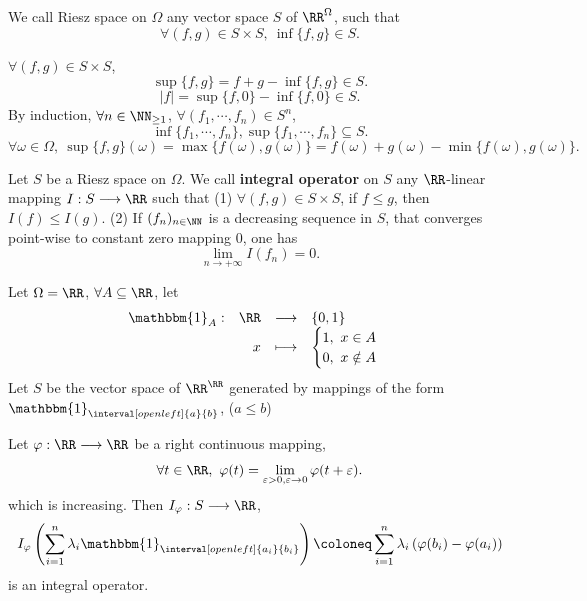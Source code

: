 \begin{definitionenv}
    We call Riesz space on $\Omega$ any vector space $S$ of $\RR^\Omega$, such that 
    $$ \forall (f,g)\in S\times S,\ \inf\{f,g\}\in S.$$
\end{definitionenv}
\begin{remark}
    $\forall (f,g)\in S\times S$, 
    $$ \sup \{f,g\}=f+g-\inf\{f,g\}\in S.$$
    $$ |f|=\sup \{f,0\} -\inf\{f,0\} \in S.$$
    By induction, $\forall n\in \NN_{\ge 1}$, $\forall (f_1,\cdots,f_n)\in S^n$, 
    $$ \inf\{f_1,\cdots,f_n\}, \sup\{f_1,\cdots,f_n\}\subseteq S.$$
    $$ \forall \omega \in \Omega,\ \sup\{f,g\}(\omega)=\max\{f(\omega),g(\omega)\}=f(\omega)+g(\omega)-\min\{f(\omega),g(\omega)\}.$$
\end{remark}
\begin{definitionenv}
    Let $S$ be a Riesz space on $\Omega$. We call \textbf{integral operator} on $S$ any $\RR$-linear mapping $I:S\longrightarrow \RR$ such that
    \newline
    (1) $\forall (f,g)\in S\times S$, if $f\le g$, then $I(f)\le I(g)$.
    \newline
    (2) If $(f_n)_{n\in\NN}$ is a decreasing sequence in $S$, that converges point-wise to constant zero mapping $0$, one has 
    $$ \lim_{n\rightarrow +\infty}I(f_n)=0.$$
\end{definitionenv}
\begin{exampleenv}
    Let $\Omega=\RR$, $\forall A\subseteq \RR$, let 
    $$ \begin{array}{rrcl}
        \mathbbm{1}_A:& \RR &\longrightarrow& \{0,1\}\\
        &x&\longmapsto& \begin{cases}
            1,\ x\in A\\
            0,\ x\notin A
        \end{cases}
    \end{array}$$
    Let $S$ be the vector space of $\RR^\RR$ generated by mappings of the form $\mathbbm{1}_{\interval[open left]{a}{b}}$, ($a\le b$)
    

    Let $\varphi:\RR\longrightarrow \RR$ be a right continuous mapping,
    $$\forall t\in \RR,\  \varphi(t)=\lim_{\varepsilon>0,\varepsilon\rightarrow 0}\varphi(t+\varepsilon).$$
    which is increasing.
    Then $I_{\varphi}: S\longrightarrow \RR$, 
    $$I_\varphi\left(\sum_{i=1}^{n}\lambda_i \mathbbm{1}_{\interval[open left]{a_i}{b_i}}\right)\coloneq \sum_{i=1}^{n}\lambda_i\left(\varphi(b_i)-\varphi(a_i)\right)$$
    is an integral operator.
\end{exampleenv}
